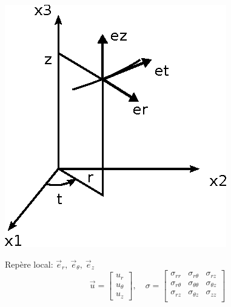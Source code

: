 \begin{multicols}{2}
    \includegraphics{../images/T1_AnnA-0002}
    \columnbreak

    Repère local: $\vec{e}_r,\ \vec{e}_{\theta},\ \vec{e}_{z}$
    \begin{displaymath}
        \vec{u} = 
        \begin{bmatrix}
            u_r \\
            u_{\theta} \\
            u_z
        \end{bmatrix}, \quad
        \mathbb{\sigma} = 
        \begin{bmatrix}
            \sigma_{rr} & \sigma_{r\theta} & \sigma_{rz} \\
            \sigma_{r\theta} & \sigma_{\theta\theta} & \sigma_{\theta z} \\
            \sigma_{rz} & \sigma_{\theta z} & \sigma_{zz} \\
        \end{bmatrix}
    \end{displaymath}
\end{multicols}

